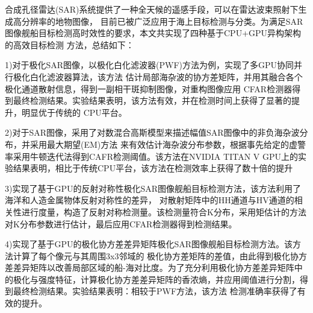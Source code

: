 \begin{cabstract}
  合成孔径雷达(SAR)系统提供了一种全天候的遥感手段，可以在雷达波束照射下生成高分辨率的地物图像，
  目前已被广泛应用于海上目标检测与分类。为满足SAR图像舰船目标检测高时效性的要求，本文共实现了四种基于CPU+GPU异构架构的高效目标检测
  方法，总结如下：

  1)对于极化SAR图像，以极化白化滤波器(PWF)方法为例，实现了多GPU协同并行极化白化滤波器算法，该方法
  估计局部海杂波的协方差矩阵，并用其融合各个极化通道散射信息，得到一副相干斑抑制图像，对重构图像应用
  CFAR检测器得到最终检测结果。实验结果表明，该方法有效，并在检测时间上获得了显著的提升，明显优于传统的
  CPU平台。

  2)对于SAR图像，采用了对数混合高斯模型来描述幅值SAR图像中的非负海杂波分布，并采用最大期望(EM)方法
  来有效估计海杂波分布参数，根据事先给定的虚警率采用牛顿迭代法得到CAFR检测阈值。该方法在NVIDIA TITAN
  V GPU上的实验结果表明，相比于传统CPU平台，该方法在检测效率上获得了数十倍的提升

  3)实现了基于GPU的反射对称性极化SAR图像舰船目标检测方法，该方法利用了海洋和人造金属物体反射对称性的差异，
  对散射矩阵中的HH通道与HV通道的相关性进行度量，构造了反射对称检测量。该检测量符合K分布，采用矩估计的方法
  对K分布参数进行估计，最后应用CFAR检测器得到检测结果。

  4)实现了基于GPU的极化协方差差异矩阵极化SAR图像舰船目标检测方法。该方法计算了每个像元与其周围3x3邻域的
  极化协方差矩阵的差值，由此得到极化协方差差异矩阵以改善局部区域的船-海对比度。为了充分利用极化协方差差异矩阵中
  的极化与强度特征，计算极化协方差差异矩阵的香浓熵，并应用阈值进行分割，得到最终检测结果。实验结果表明：相较于PWF方法，该方法
  检测准确率获得了有效的提升。

\end{cabstract}


